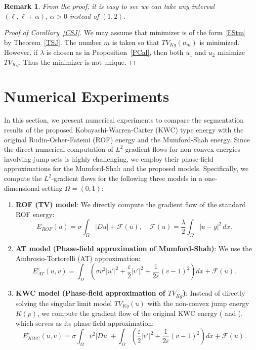 \documentclass[12pt, reqno]{amsart}
\numberwithin{equation}{section}
\newtheorem{remark}[thm]{Remark}
\begin{document}
%
\begin{remark} \label{RNU}
From the proof, it is easy to see we can take any interval $(\ell,\ell+\alpha)$, $\alpha>0$ instead of $(1,2)$.
\end{remark}
%
\begin{proof}[Proof of Corollary~\ref{CSJ}]
We may assume that minimizer is of the form \eqref{EStm} by Theorem~\ref{TSJ}.
 The number $m$ is taken so that $TV_{Kg}(u_m)$ is minimized.
 However, if $\lambda$ is chosen as in Proposition~\ref{PCal}, then both $u_1$ and $u_2$ minimize $TV_{Kg}$.
 Thus the minimizer is not unique.
\end{proof}

\section{Numerical Experiments} \label{SNE}

In this section, we present numerical experiments to compare the segmentation results of the proposed Kobayashi-Warren-Carter (KWC) type energy with the original Rudin-Osher-Fatemi (ROF) energy and the Mumford-Shah energy.
Since the direct numerical computation of $L^2$-gradient flows for non-convex energies involving jump sets is highly challenging, we employ their phase-field approximations for the Mumford-Shah and the proposed models.
Specifically, we compute the $L^2$-gradient flows for the following three models in a one-dimensional setting $\Omega = (0,1)$:

\begin{enumerate}
\item \textbf{ROF (TV) model}: We directly compute the gradient flow of the standard ROF energy:
\[
    E_{ROF}(u) = \sigma \int_\Omega |Du|
    + \mathcal{F}(u), \quad
    \mathcal{F}(u) = \frac{\lambda}{2} \int_\Omega |u-g|^2 \,dx.
\] 
\item \textbf{AT model (Phase-field approximation of Mumford-Shah)}: We use the Ambrosio-Tortorelli (AT) approximation:
\[
    E_{AT}^{\varepsilon}(u,v) = \int_\Omega \left( \sigma v^2 |u'|^2 + \frac{\varepsilon}{2} |v'|^2 + \frac{1}{2\varepsilon} (v-1)^2 \right) dx 
    + \mathcal{F}(u).
\]  
\item \textbf{KWC model (Phase-field approximation of $TV_{Kg}$)}: Instead of directly solving the singular limit model $TV_{Kg}(u)$ with the non-convex jump energy $K(\rho)$, we compute the gradient flow of the original KWC energy (\cite{GOSU} and \cite{GKKOSU}), which serves as its phase-field approximation:
\[
    E_{KWC}^{\varepsilon}(u,v) = \sigma \int_\Omega v^2 |Du| + \int_\Omega \left( \frac{\varepsilon}{2} |v'|^2 + \frac{1}{2\varepsilon} (v-1)^2 \right) dx
    + \mathcal{F}(u).
\]
\end{enumerate}
\end{document}

